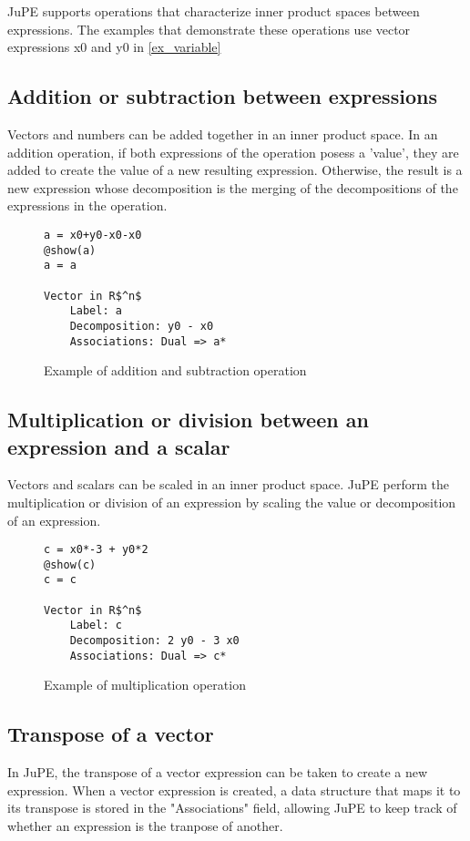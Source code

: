 JuPE supports operations that characterize inner product spaces between expressions. The examples that demonstrate these operations use vector expressions x0 and y0 in \ref{ex_variable}

\subsection*{Addition or subtraction between expressions}

Vectors and numbers can be added together in an inner product space. In an addition operation, if both expressions of the operation posess a 'value', they are added to create the value of a new resulting expression. Otherwise, the result is a new expression whose decomposition is the merging of the decompositions of the expressions in the operation.
\begin{figure}[!h]
	\begin{lstlisting}[mathescape]
a = x0+y0-x0-x0
@show(a)
a = a

Vector in R$^n$
	Label: a
	Decomposition: y0 - x0
	Associations: Dual => a*
	\end{lstlisting}
	\caption{Example of addition and subtraction operation}
	\label{ex_addsub}
\end{figure}

\subsection*{Multiplication or division between an expression and a scalar} 
Vectors and scalars can be scaled in an inner product space. JuPE perform the multiplication or division of an expression by scaling the value or decomposition of an expression.
\begin{figure}[!h]
	\begin{lstlisting}[mathescape]
c = x0*-3 + y0*2
@show(c)
c = c

Vector in R$^n$
	Label: c
	Decomposition: 2 y0 - 3 x0
	Associations: Dual => c*

	\end{lstlisting}
	\caption{Example of multiplication operation}
	\label{ex_scalar}
\end{figure}

\subsection*{Transpose of a vector}
In JuPE, the transpose of a vector expression can be taken to create a new expression. When a vector expression is created, a data structure that maps it to its transpose is stored in the "Associations" field, allowing JuPE to keep track of whether an expression is the tranpose of another.

